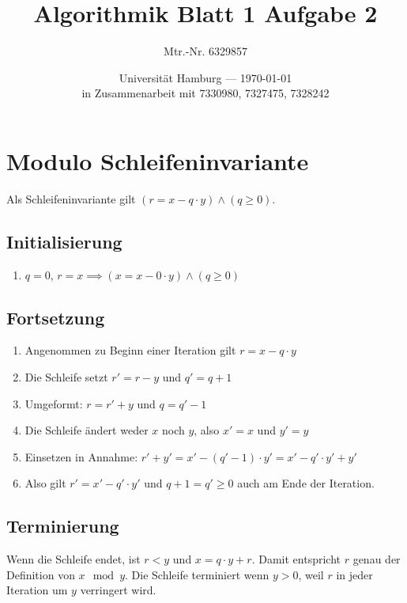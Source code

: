 \documentclass[parskip=half,a4paper]{scrartcl}
\title{Algorithmik Blatt 1 Aufgabe 2}
\author{Mtr.-Nr. 6329857}
\date{Universität Hamburg --- \today \\ in Zusammenarbeit mit 7330980, 7327475, 7328242}
\begin{document}
\maketitle

\section*{Modulo Schleifeninvariante}

Als Schleifeninvariante gilt $\left(r = x - q \cdot y\right) \land \left(q \ge 0\right)$.

\subsection*{Initialisierung}

\begin{enumerate}
	\item $q = 0$, $r = x \implies \left(x = x - 0 \cdot y\right) \land \left(q \ge 0\right)$
\end{enumerate}

\subsection*{Fortsetzung}

\begin{enumerate}
	\item Angenommen zu Beginn einer Iteration gilt $r = x - q \cdot y$
	\item Die Schleife setzt $r' = r - y$ und $q' = q + 1$
	\item Umgeformt: $r = r' + y$ und $q = q' - 1$
	\item Die Schleife ändert weder $x$ noch $y$, also $x' = x$ und $y' = y$
	\item Einsetzen in Annahme: $r' + y' = x' - \left(q' - 1\right) \cdot y' = x' - q' \cdot y' + y'$
	\item Also gilt $r' = x' - q' \cdot y'$ und $q + 1 = q' \ge 0$ auch am Ende der Iteration.
\end{enumerate}

\subsection*{Terminierung}

Wenn die Schleife endet, ist $r < y$ und $x = q \cdot y + r$. Damit entspricht $r$ genau der Definition von $x \mod y$. Die Schleife terminiert wenn $y > 0$, weil $r$ in jeder Iteration um $y$ verringert wird.
\end{document}
